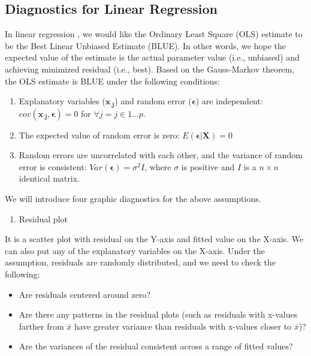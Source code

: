 \documentclass[
  12pt,
]{krantz}
\providecommand{\tightlist}{%
  \setlength{\itemsep}{0pt}\setlength{\parskip}{0pt}}
\begin{document}
\hypertarget{diagnostics-for-linear-regression}{%
\subsection{Diagnostics for Linear Regression}\label{diagnostics-for-linear-regression}}

In linear regression , we would like the Ordinary Least Square (OLS)  estimate to be the Best Linear Unbiased Estimate (BLUE). In other words, we hope the expected value of the estimate is the actual parameter value (i.e., unbiased) and achieving minimized residual (i.e., best). Based on the Gauss-Markov theorem, the OLS  estimate is BLUE  under the following conditions:

\begin{enumerate}
\def\labelenumi{\arabic{enumi}.}
\item
  Explanatory variables (\(\mathbf{x_{.j}}\)) and random error (\(\mathbf{\epsilon}\)) are independent: \(cov(\mathbf{x_{.j},\epsilon})=0\) for \(\forall j=j\in1...p\).
\item
  The expected value of random error is zero: \(E(\mathbf{\epsilon|X})=0\)
\item
  Random errors are uncorrelated with each other, and the variance of random error is consistent: \(Var(\mathbf{\epsilon})=\sigma^{2}I\), where \(\sigma\) is positive and \(I\) is a \(n \times n\) identical matrix.
\end{enumerate}

We will introduce four graphic diagnostics for the above assumptions.

\begin{enumerate}
\def\labelenumi{(\arabic{enumi})}
\tightlist
\item
  Residual plot 
\end{enumerate}

It is a scatter plot with residual on the Y-axis and fitted value on the X-axis. We can also put any of the explanatory variables on the X-axis. Under the assumption, residuals are randomly distributed, and we need to check the following:

\begin{itemize}
\tightlist
\item
  Are residuals centered around zero?
\item
  Are there any patterns in the residual plots (such as residuals with x-values farther from \(\bar{x}\) have greater variance than residuals with x-values closer to \(\bar{x}\))?
\item
  Are the variances of the residual consistent across a range of fitted values?
\end{itemize}
\end{document}
